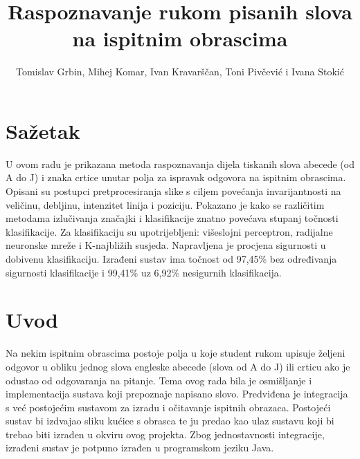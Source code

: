 \documentclass[a4paper,twocolumn,dvipdfm]{article}
\begin{document}
\title{Raspoznavanje rukom pisanih slova na ispitnim obrascima} 
\author{Tomislav Grbin, Mihej Komar, Ivan Kravarščan, Toni Pivčević i Ivana Stokić}
\maketitle


\section*{Sažetak}
U ovom radu je prikazana metoda raspoznavanja dijela tiskanih slova abecede (od
A do J) i znaka crtice unutar polja za ispravak odgovora na ispitnim obrascima.
Opisani su postupci pretprocesiranja slike s ciljem povećanja invarijantnosti na
veličinu, debljinu, intenzitet linija i poziciju. Pokazano je kako se
različitim metodama izlučivanja značajki i klasifikacije znatno povećava stupanj
točnosti klasifikacije. Za klasifikaciju su upotrijebljeni: višeslojni
perceptron, radijalne neuronske mreže i K-najbližih susjeda. Napravljena je
procjena sigurnosti u dobivenu klasifikaciju. Izrađeni sustav ima točnost od
97,45\% bez određivanja sigurnosti klasifikacije i 99,41\% uz 6,92\% nesigurnih
klasifikacija.

\section{Uvod}
Na nekim ispitnim obrascima postoje polja u koje student rukom upisuje željeni
odgovor u obliku jednog slova engleske abecede (slova od A do J) ili crticu ako
je odustao od odgovaranja na pitanje. Tema ovog rada bila je osmišljanje i
implementacija sustava koji prepoznaje napisano slovo. Predviđena je integracija
s već postojećim sustavom za izradu i očitavanje ispitnih obrazaca. Postojeći
sustav bi izdvajao sliku kućice s obrasca te ju predao kao ulaz sustavu
koji bi trebao biti izrađen u okviru ovog projekta. Zbog jednostavnosti
integracije, izrađeni sustav je potpuno izrađen u programskom jeziku Java.
\end{document}
